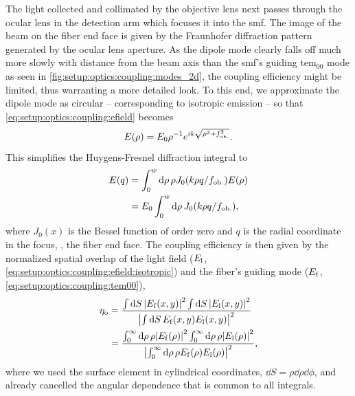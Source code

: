 The light collected and collimated by the objective lens next passes through the ocular lens in the detection arm which focuses it into the \gls{smf}.
The image of the beam on the fiber end face is given by the Fraunhofer diffraction pattern generated by the ocular lens aperture.
As the dipole mode clearly falls off much more slowly with distance from the beam axis than the \gls{smf}'s guiding \acrshort{tem}$_{00}$ mode as seen in \cref{fig:setup:optics:coupling:modes_2d}, the coupling efficiency might be limited, thus warranting a more detailed look.
To this end, we approximate the dipole mode as circular -- corresponding to isotropic emission -- so that \cref{eq:setup:optics:coupling:efield} becomes
\begin{equation}\label{eq:setup:optics:coupling:efield:isotropic}
    E(\rho) = E_0\rho^{-1}e^{i k \sqrt{\rho^2 + f_{\mathrm{ob.}}^2}}.
\end{equation}
This simplifies the Huygens-Fresnel diffraction integral to~\cite{Hecht2017}
\begin{equation}\label{eq:setup:optics:coupling:huygens_fresnel}
    \begin{split}
        E(q) &= \int_{0}^{w}\dd{\rho} \rho J_0(k\rho q/f_{\mathrm{ob.}}) E(\rho) \\
             &= E_0\int_{0}^{w}\dd{\rho} J_0(k\rho q/f_{\mathrm{ob.}}),
    \end{split}
\end{equation}
where $J_0(x)$ is the Bessel function of order zero and $q$ is the radial coordinate in the focus, \ie, the fiber end face.
The coupling efficiency is then given by the normalized spatial overlap of the light field ($E_{\mathrm{l}}$, \cref{eq:setup:optics:coupling:efield:isotropic}) and the fiber's guiding mode ($E_{\mathrm{f}}$, \cref{eq:setup:optics:coupling:tem00}),
\begin{equation}\label{eq:setup:optics:coupling:overlap}
    \begin{split}
        \eta_{\mathrm{o}} &= \frac{\int\dd{S}\abs{E_{\mathrm{f}}(x, y)}^2\int\dd{S}\abs{E_{\mathrm{l}}(x, y)}^2}{\abs{\int\dd{S} E_{\mathrm{f}}(x, y) E_{\mathrm{l}}(x, y)}^2} \\
                      &= \frac{\int_{0}^{\infty}\dd{\rho}\rho\abs{E_{\mathrm{f}}(\rho)}^2\int_{0}^{\infty}\dd{\rho}\rho\abs{E_{\mathrm{l}}(\rho)}^2}{\abs{\int_{0}^{\infty}\dd{\rho}\rho E_{\mathrm{f}}(\rho) E_{\mathrm{l}}(\rho)}^2},
    \end{split}
\end{equation}
where we used the surface element in cylindrical coordinates, $\dd{S}=\rho\dd{\rho}\dd{\phi}$, and already cancelled the angular dependence that is common to all integrals.

